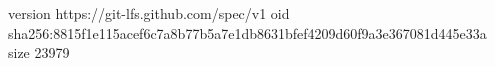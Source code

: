 version https://git-lfs.github.com/spec/v1
oid sha256:8815f1e115acef6c7a8b77b5a7e1db8631bfef4209d60f9a3e367081d445e33a
size 23979
